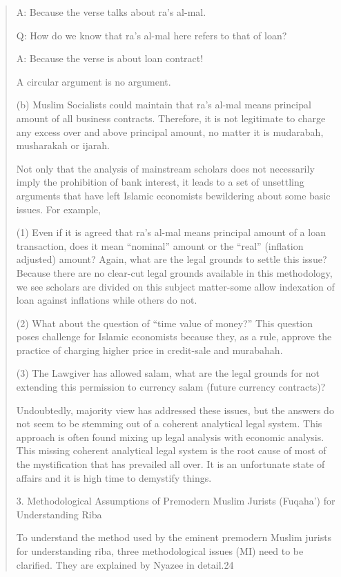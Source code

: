\begin{quote}
A: Because the verse talks about ra's al-mal.

Q: How do we know that ra's al-mal here refers to that of loan?

A: Because the verse is about loan contract!

A circular argument is no argument.

(b) Muslim Socialists could maintain that ra's al-mal means principal amount of all business contracts. Therefore, it is not legitimate to charge any excess over and above principal amount, no matter it is mudarabah, musharakah or ijarah.

Not only that the analysis of mainstream scholars does not necessarily imply the prohibition of bank interest, it leads to a set of unsettling arguments that have left Islamic economists bewildering about some basic issues. For example,

(1) Even if it is agreed that ra's al-mal means principal amount of a loan transaction, does it mean “nominal” amount or the “real” (inflation adjusted) amount? Again, what are the legal grounds to settle this issue? Because there are no clear-cut legal grounds available in this methodology, we see scholars are divided on this subject matter-some allow indexation of loan against inflations while others do not.

(2) What about the question of “time value of money?” This question poses challenge for Islamic economists because they, as a rule, approve the practice of charging higher price in credit-sale and murabahah.

(3) The Lawgiver has allowed salam, what are the legal grounds for not extending this permission to currency salam (future currency contracts)?

Undoubtedly, majority view has addressed these issues, but the answers do not seem to be stemming out of a coherent analytical legal system. This approach is often found mixing up legal analysis with economic analysis. This missing coherent analytical legal system is the root cause of most of the mystification that has prevailed all over. It is an unfortunate state of affairs and it is high time to demystify things.

3. Methodological Assumptions of Premodern Muslim Jurists (Fuqaha') for Understanding Riba

To understand the method used by the eminent premodern Muslim jurists for understanding riba, three methodological issues (MI) need to be clarified. They are explained by Nyazee in detail.24


\end{quote}
